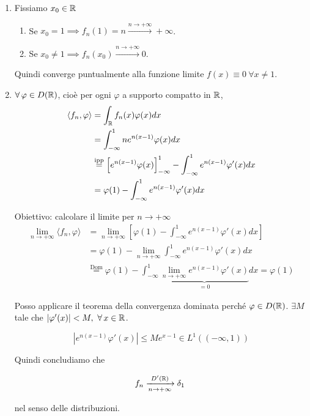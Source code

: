 \begin{enumerate}
\item Fissiamo $x_{0} \in \mathbb{R} $
\begin{enumerate}
\item Se $x_{0} =1\implies f_{n}( 1) =n\xrightarrow{n\rightarrow +\infty } +\infty $.
\item Se $x_{0} \neq 1\implies f_{n}( x_{0})\xrightarrow{n\rightarrow +\infty } 0$.
\end{enumerate}

Quindi converge puntualmente alla funzione limite $f( x) \equiv 0\ \forall x\neq 1$.
\item $\forall \varphi \in D(\RR )$, cioè per ogni $\varphi $ a supporto compatto in $\mathbb{R} $,\begin{align*}
\langle f_{n} ,\varphi \rangle  & =\int _{\mathbb{R} } f_{n}( x) \varphi ( x) dx\\
 & =\int ^{1}_{-\infty } ne^{n( x-1)} \varphi ( x) dx\\
 & \overset{\text{ipp}}{=}\left[ e^{n( x-1)} \varphi ( x)\right]^{1}_{-\infty } -\int ^{1}_{-\infty } e^{n( x-1)} \varphi '( x) dx\\
 & =\varphi ( 1) -\int ^{1}_{-\infty } e^{n( x-1)} \varphi '( x) dx
\end{align*}

Obiettivo: calcolare il limite per $n\rightarrow +\infty $\begin{align*}
\lim\limits _{n\rightarrow +\infty } \langle f_{n} ,\varphi \rangle  & =\lim\limits _{n\rightarrow +\infty }\left[ \varphi ( 1) -\int ^{1}_{-\infty } e^{n( x-1)} \varphi '( x) dx\right]\\
 & =\varphi ( 1) -\lim\limits _{n\rightarrow +\infty }\int ^{1}_{-\infty } e^{n( x-1)} \varphi '( x) dx\\
 & \overset{\text{Dom}}{=} \varphi ( 1) -\int ^{1}_{-\infty }\underbrace{\lim\limits _{n\rightarrow +\infty } e^{n( x-1)} \varphi '( x)}_{=0} dx=\varphi ( 1)
\end{align*}

Posso applicare il teorema della convergenza dominata perché $\varphi \in D(\mathbb{R} )$. $\exists M$ tale che $| \varphi '( x)| < M,\ \forall x\in \RR $.

\begin{equation*}
\left| e^{n( x-1)} \varphi '( x)\right| \leqslant Me^{x-1} \in L^{1}(( -\infty ,1))
\end{equation*}

Quindi concludiamo che

\begin{equation*}
f_{n}\xrightarrow[n\rightarrow +\infty ]{D'(\mathbb{R} )} \delta _{1} \ 
\end{equation*}

nel senso delle distribuzioni.
\end{enumerate}
